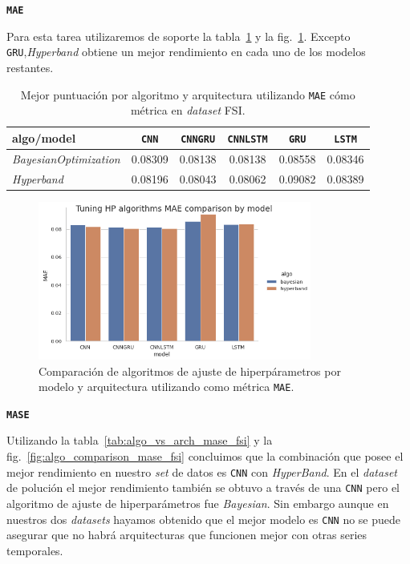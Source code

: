 \documentclass[a4paper,12pt]{article}
\begin{document}
\textbf{\texttt{MAE}}

Para esta tarea utilizaremos de soporte la tabla~\ref{tab:algo_vs_arch_mae_fsi} y la fig.~\ref{fig:algo_comparison_mae_fsi}. Excepto \texttt{GRU},\textit{Hyperband} obtiene un mejor rendimiento en cada uno de los modelos restantes.

\begin{table}[H]
\centering
\begin{tabular}{l|ccccc}
\hline
algo/model & \texttt{CNN} & \texttt{CNNGRU} & \texttt{CNNLSTM} & \texttt{GRU} & \texttt{LSTM} \\ \hline
\textit{BayesianOptimization}         & 0.08309     & 0.08138        & 0.08138         & 0.08558     & 0.08346      \\
\textit{Hyperband}         & 0.08196     & 0.08043        & 0.08062         & 0.09082     & 0.08389      \\ \hline
\end{tabular}
\caption{Mejor puntuación por algoritmo y arquitectura utilizando \texttt{MAE} cómo métrica en \textit{dataset} FSI.}
\label{tab:algo_vs_arch_mae_fsi}
\end{table}

\begin{figure}[H]
	\begin{center}
	\includegraphics[width=0.8\textwidth]{model_vs_algo_hp_mae_fsi.png}
  	\caption{Comparación de algoritmos de ajuste de hiperpárametros por modelo y arquitectura utilizando como métrica \texttt{MAE}.}
  	\label{fig:algo_comparison_mae_fsi}
  	\end{center}
\end{figure}

\textbf{\texttt{MASE}}

Utilizando la tabla~\ref{tab:algo_vs_arch_mase_fsi} y la fig.~\ref{fig:algo_comparison_mase_fsi} concluimos que la combinación que posee el mejor rendimiento en nuestro \textit{set} de datos es \texttt{CNN} con \textit{HyperBand}. En el \textit{dataset} de polución el mejor rendimiento también se obtuvo a través de una \texttt{CNN} pero el algoritmo de ajuste de hiperparámetros fue \textit{Bayesian}. Sin embargo aunque en nuestros dos \textit{datasets} hayamos obtenido que el mejor modelo es \texttt{CNN} no se puede asegurar que no habrá arquitecturas que funcionen mejor con otras series temporales.
\end{document}
